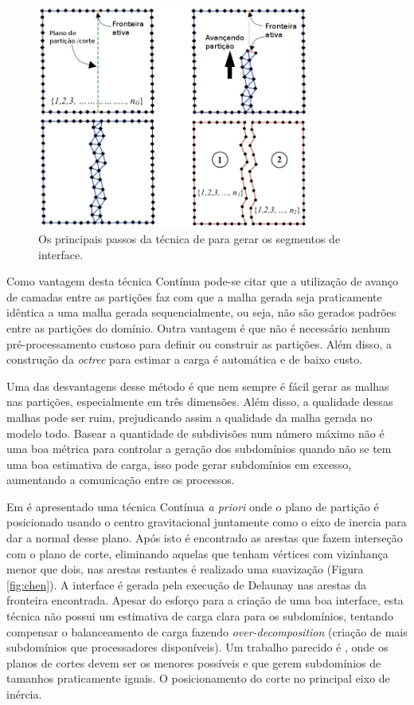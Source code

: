  \begin{figure}[htbp]
     \centering
     \includegraphics[width=0.8\textwidth]{fig/pirzadeh09.jpg}
     \caption{Os principais passos da técnica de \cite{bib:Pirzadeh09} para gerar os segmentos de interface.}
     \label{fig:pirzadeh09}
 \end{figure}
 
Como vantagem desta técnica Contínua pode-se citar que a utilização de avanço de camadas entre as partições faz com que a malha gerada seja praticamente idêntica a uma malha gerada sequencialmente, ou seja, não são gerados padrões entre as partições do domínio. Outra vantagem é que não é necessário nenhum pré-processamento custoso para definir ou construir as partições. Além disso, a construção da \textit{octree} para estimar a carga é automática e de baixo custo.

Uma das desvantagens desse método é que nem sempre é fácil gerar as malhas nas partições, especialmente em três dimensões. Além disso, a qualidade dessas malhas pode ser ruim, prejudicando assim a qualidade da malha gerada no modelo todo. Basear a quantidade de subdivisões num número máximo não é uma boa métrica para controlar a geração dos subdomínios quando não se tem uma boa estimativa de carga, isso pode gerar subdomínios em excesso, aumentando a comunicação entre os processos. 
 
 
Em \cite{bib:CHEN12} é apresentado uma técnica Contínua \textit{a priori} onde o plano de partição é posicionado usando o centro gravitacional juntamente como o eixo de inercia para dar a normal desse plano. Após isto é encontrado as arestas que fazem interseção com o plano de corte, eliminando aquelas que tenham vértices com vizinhança menor que dois, nas arestas restantes é realizado uma suavização (Figura \ref{fig:chen}). A interface é gerada pela execução de Delaunay nas arestas da fronteira encontrada. Apesar do esforço para a criação de uma boa interface, esta técnica não possui um estimativa de carga clara para os subdomínios, tentando compensar o balanceamento de carga fazendo \textit{over-decomposition} (criação de mais subdomínios que processadores disponíveis). Um trabalho parecido é \cite{bib:ZHENG09}, onde os planos de cortes devem ser os menores possíveis e que gerem subdomínios de tamanhos praticamente iguais. O posicionamento do corte no principal eixo de inércia.


